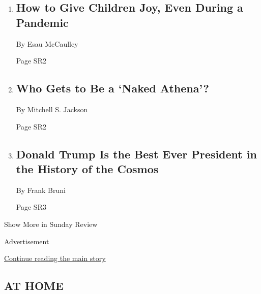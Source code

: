 \begin{enumerate}
\def\labelenumi{\arabic{enumi}.}
\item
  \href{/2020/07/23/opinion/sunday/coronavirus-parenting-joy.html}{}

  \hypertarget{how-to-give-children-joy-even-during-a-pandemic}{%
  \subsection{How to Give Children Joy, Even During a
  Pandemic}\label{how-to-give-children-joy-even-during-a-pandemic}}

  By Esau McCaulley

  Page SR2
\item
  \href{/2020/07/25/opinion/sunday/portland-protests-white.html}{}

  \hypertarget{who-gets-to-be-a-naked-athena}{%
  \subsection{Who Gets to Be a `Naked
  Athena'?}\label{who-gets-to-be-a-naked-athena}}

  By Mitchell S. Jackson

  Page SR2
\item
  \href{/2020/07/25/opinion/sunday/trump-lies.html}{}

  \hypertarget{donald-trump-is-the-best-ever-president-in-the-history-of-the-cosmos}{%
  \subsection{Donald Trump Is the Best Ever President in the History of
  the
  Cosmos}\label{donald-trump-is-the-best-ever-president-in-the-history-of-the-cosmos}}

  By Frank Bruni

  Page SR3
\end{enumerate}

Show More in Sunday Review

Advertisement

\protect\hyperlink{after-mid5}{Continue reading the main story}

\hypertarget{at-home}{%
\subsection{AT HOME}\label{at-home}}

